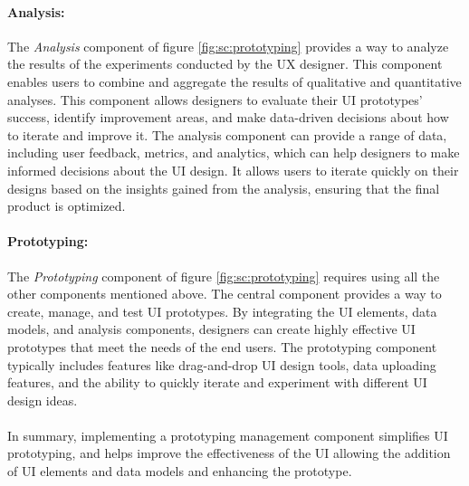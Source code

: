 \paragraph{Analysis:}
The \textit{Analysis} component of figure \ref{fig:sc:prototyping} provides a way to analyze the results of the experiments conducted by the UX designer. 
This component enables users to combine and aggregate the results of qualitative and quantitative analyses.
This component allows designers to evaluate their UI prototypes' success, identify improvement areas, and make data-driven decisions about how to iterate and improve it. 
The analysis component can provide a range of data, including user feedback, metrics, and analytics, which can help designers to make informed decisions about the UI design.
It allows users to iterate quickly on their designs based on the insights gained from the analysis, ensuring that the final product is optimized.

\paragraph{Prototyping:}
The \textit{Prototyping} component of figure \ref{fig:sc:prototyping} requires using all the other components mentioned above. 
The central component provides a way to create, manage, and test UI prototypes. 
By integrating the UI elements, data models, and analysis components, designers can create highly effective UI prototypes that meet the needs of the end users. 
The prototyping component typically includes features like drag-and-drop UI design tools, data uploading features, and the ability to quickly iterate and experiment with different UI design ideas.\\\\
In summary, implementing a prototyping management component simplifies UI prototyping, and helps improve the effectiveness of the UI allowing the addition of UI elements and data models and enhancing the prototype.

